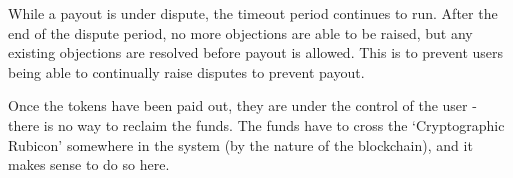 While a payout is under dispute, the timeout period continues to run. After the end of the dispute period, no more objections are able to be raised, but any existing objections are resolved before payout is allowed.  This is to prevent users being able to continually raise disputes to prevent payout.

Once the tokens have been paid out, they are under the control of the user - there is no way to reclaim the funds. The funds have to cross the `Cryptographic Rubicon' somewhere in the system (by the nature of the blockchain), and it makes sense to do so here. %